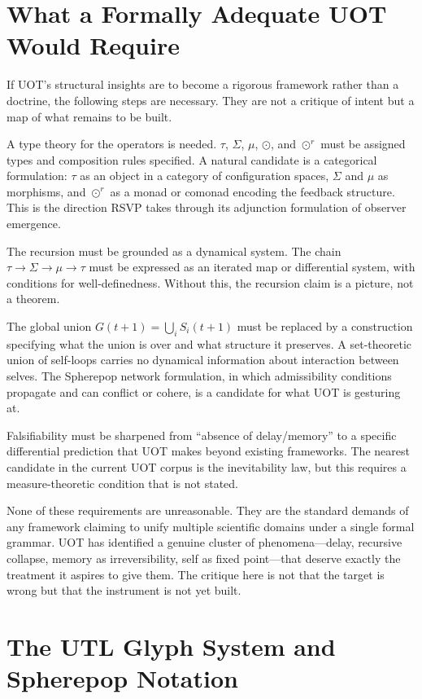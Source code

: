\documentclass[12pt, oneside]{article}
\theoremstyle{plain-remark}
\newcommand{\utau}{\tau}
\newcommand{\uSigma}{\Sigma}
\newcommand{\umu}{\mu}
\newcommand{\ucollapse}{\odot}
\newcommand{\urcollapse}{\odot^r}
\begin{document}
\section{What a Formally Adequate UOT Would Require}

If UOT's structural insights are to become a rigorous framework rather than a doctrine,
the following steps are necessary. They are not a critique of intent but a map of what
remains to be built.

A type theory for the operators is needed. $\utau$, $\uSigma$, $\umu$, $\ucollapse$, and
$\urcollapse$ must be assigned types and composition rules specified. A natural candidate
is a categorical formulation: $\utau$ as an object in a category of configuration spaces,
$\uSigma$ and $\umu$ as morphisms, and $\urcollapse$ as a monad or comonad encoding the
feedback structure. This is the direction RSVP takes through its adjunction formulation
of observer emergence.

The recursion must be grounded as a dynamical system. The chain $\utau \to \uSigma \to
\umu \to \utau$ must be expressed as an iterated map or differential system, with conditions
for well-definedness. Without this, the recursion claim is a picture, not a theorem.

The global union $G(t+1) = \bigcup_i S_i(t+1)$ must be replaced by a construction
specifying what the union is over and what structure it preserves. A set-theoretic union
of self-loops carries no dynamical information about interaction between selves. The
Spherepop network formulation, in which admissibility conditions propagate and can conflict
or cohere, is a candidate for what UOT is gesturing at.

Falsifiability must be sharpened from ``absence of delay/memory'' to a specific
differential prediction that UOT makes beyond existing frameworks. The nearest candidate
in the current UOT corpus is the inevitability law, but this requires a measure-theoretic
condition that is not stated.

None of these requirements are unreasonable. They are the standard demands of any framework
claiming to unify multiple scientific domains under a single formal grammar. UOT has
identified a genuine cluster of phenomena---delay, recursive collapse, memory as
irreversibility, self as fixed point---that deserve exactly the treatment it aspires to
give them. The critique here is not that the target is wrong but that the instrument is
not yet built.


\section{The UTL Glyph System and Spherepop Notation}
\end{document}
